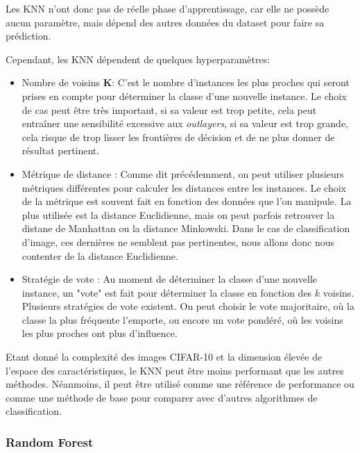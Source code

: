 Les KNN n'ont donc pas de réelle phase d'apprentissage, car elle ne possède aucun paramètre, mais dépend des autres données du dataset pour faire sa prédiction.

Cependant, les KNN dépendent de quelques hyperparamètres:
\begin{itemize}
\item Nombre de voisins \textbf{K}: C'est le nombre d'instances les plus proches qui seront prises en compte pour déterminer la classe d'une nouvelle instance. Le choix de cas peut être très important, si sa valeur est trop petite, cela peut entraîner une sensibilité excessive aux \textit{outlayers}, si sa valeur est trop grande, cela risque de trop lisser les frontières de décision et de ne plus donner de résultat pertinent.
\item Métrique de distance : Comme dit précédemment, on peut utiliser plusieurs métriques différentes pour calculer les distances entre les instances. Le choix de la métrique est souvent fait en fonction des données que l'on manipule. La plus utilisée est la distance Euclidienne, mais on peut parfois retrouver la distane de Manhattan ou la distance Minkowski. Dans le cas de classification d'image, ces dernières ne semblent pas pertinentes, nous allons donc nous contenter de la distance Euclidienne.
\item Stratégie de vote : Au moment de déterminer la classe d'une nouvelle instance, un "vote" est fait pour déterminer la classe en fonction des $k$ voisins. Plusieurs stratégies de vote existent. On peut choisir le vote majoritaire, où la classe la plus fréquente l'emporte, ou encore un vote pondéré, où les voisins les plus proches ont plus d'influence.
\end{itemize}

Etant donné la complexité des images CIFAR-10 et la dimension élevée de l'espace des caractéristiques, le KNN peut être moins performant que les autres méthodes. Néanmoins, il peut être utilisé comme une référence de performance ou comme une méthode de base pour comparer avec d'autres algorithmes de classification.

\subsubsection{Random Forest}

